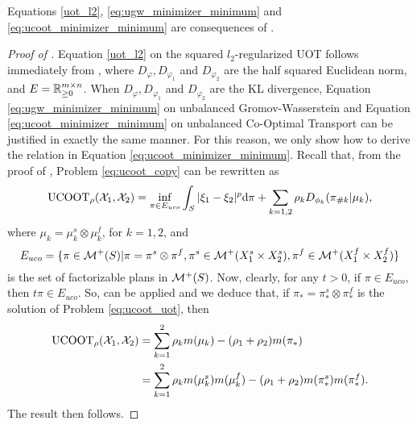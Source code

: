 \begin{corollary}
  \label{coro:conseq}
  Equations \eqref{uot_l2}, \eqref{eq:ugw_minimizer_minimum} and \eqref{eq:ucoot_minimizer_minimum}
  are consequences of .
\end{corollary}
\begin{proof}[Proof of ]
  Equation \eqref{uot_l2} on the squared $l_2$-regularized UOT follows immediately from ,
  where $D_{\varphi}, D_{\varphi_1}$ and $D_{\varphi_2}$ are the half squared Euclidean norm,
  and $E = \mathbb R^{m \times n}_{\geq 0}$. When
  $D_{\varphi}, D_{\varphi_1}$ and $D_{\varphi_2}$ are the KL divergence,
  Equation \eqref{eq:ugw_minimizer_minimum} on unbalanced Gromov-Wasserstein and
  Equation \eqref{eq:ucoot_minimizer_minimum} on unbalanced Co-Optimal Transport can be
  justified in exactly the same manner. For this reason, we only show how to derive the relation in
  Equation \eqref{eq:ucoot_minimizer_minimum}. Recall that,
  from the proof of , Problem \eqref{eq:ucoot_copy} can be rewritten as
    \begin{equation}
      \label{eq:ucoot_uot}
      \text{UCOOT}_{\rho}(\mathcal X_1, \mathcal X_2) =
      \inf_{\pi \in E_{uco}} \int_{S} \vert \xi_1 - \xi_2 \vert^p
      \mathrm d\pi + \sum_{k=1,2} \rho_k D_{\phi_k}(\pi_{\# k} \vert \mu_k),
    \end{equation}
    where $\mu_k = \mu_k^s \otimes \mu_k^f$, for $k=1,2$, and
    \begin{equation}
      E_{uco} = \{ \pi \in \mathcal M^+(S) \vert \pi = \pi^s \otimes \pi^f,
      \pi^s \in \mathcal M^+(X_1^s \times X_2^s),
      \pi^f \in \mathcal M^+(X_1^f \times X_2^f) \}
    \end{equation}
    is the set of factorizable plans in $\mathcal M^+(S)$. Now, clearly, for any $t > 0$,
    if $\pi \in E_{uco}$, then $t \pi \in E_{uco}$. So,  can be applied
    and we deduce that, if $\pi_* = \pi_*^s \otimes \pi_*^f$ is the solution of Problem
    \eqref{eq:ucoot_uot}, then
    \begin{align}
      \text{UCOOT}_{\rho}(\mathcal X_1, \mathcal X_2) &= \sum_{k=1}^2 \rho_k m(\mu_k) - (\rho_1 + \rho_2) m(\pi_*) \\
      &= \sum_{k=1}^2 \rho_k m(\mu_k^s) m(\mu_k^f) - (\rho_1 + \rho_2) m(\pi_*^s) m(\pi_*^f).
    \end{align}
    The result then follows.
\end{proof}



